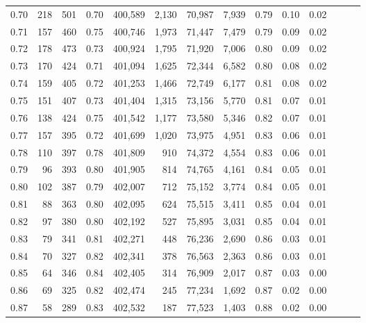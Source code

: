 \begin{tabular}{rrrrrrrrrrrrrr}
0.70 &     218 &    501 &  0.70 &  400,589 &    2,130 &  70,987 &   7,939 &  0.79 &  0.10 &      0.02 \\
0.71 &     157 &    460 &  0.75 &  400,746 &    1,973 &  71,447 &   7,479 &  0.79 &  0.09 &      0.02 \\
0.72 &     178 &    473 &  0.73 &  400,924 &    1,795 &  71,920 &   7,006 &  0.80 &  0.09 &      0.02 \\
0.73 &     170 &    424 &  0.71 &  401,094 &    1,625 &  72,344 &   6,582 &  0.80 &  0.08 &      0.02 \\
0.74 &     159 &    405 &  0.72 &  401,253 &    1,466 &  72,749 &   6,177 &  0.81 &  0.08 &      0.02 \\
0.75 &     151 &    407 &  0.73 &  401,404 &    1,315 &  73,156 &   5,770 &  0.81 &  0.07 &      0.01 \\
0.76 &     138 &    424 &  0.75 &  401,542 &    1,177 &  73,580 &   5,346 &  0.82 &  0.07 &      0.01 \\
0.77 &     157 &    395 &  0.72 &  401,699 &    1,020 &  73,975 &   4,951 &  0.83 &  0.06 &      0.01 \\
0.78 &     110 &    397 &  0.78 &  401,809 &      910 &  74,372 &   4,554 &  0.83 &  0.06 &      0.01 \\
0.79 &      96 &    393 &  0.80 &  401,905 &      814 &  74,765 &   4,161 &  0.84 &  0.05 &      0.01 \\
0.80 &     102 &    387 &  0.79 &  402,007 &      712 &  75,152 &   3,774 &  0.84 &  0.05 &      0.01 \\
0.81 &      88 &    363 &  0.80 &  402,095 &      624 &  75,515 &   3,411 &  0.85 &  0.04 &      0.01 \\
0.82 &      97 &    380 &  0.80 &  402,192 &      527 &  75,895 &   3,031 &  0.85 &  0.04 &      0.01 \\
0.83 &      79 &    341 &  0.81 &  402,271 &      448 &  76,236 &   2,690 &  0.86 &  0.03 &      0.01 \\
0.84 &      70 &    327 &  0.82 &  402,341 &      378 &  76,563 &   2,363 &  0.86 &  0.03 &      0.01 \\
0.85 &      64 &    346 &  0.84 &  402,405 &      314 &  76,909 &   2,017 &  0.87 &  0.03 &      0.00 \\
0.86 &      69 &    325 &  0.82 &  402,474 &      245 &  77,234 &   1,692 &  0.87 &  0.02 &      0.00 \\
0.87 &      58 &    289 &  0.83 &  402,532 &      187 &  77,523 &   1,403 &  0.88 &  0.02 &      0.00 \\

\end{tabular}
